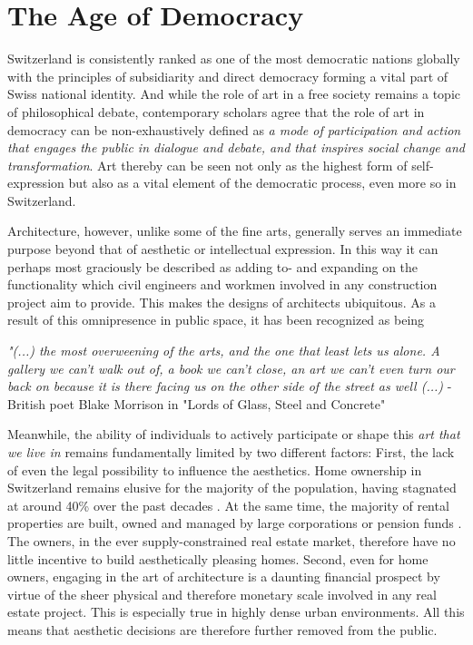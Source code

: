 \documentclass{article}
\begin{document}
\clearpage
\section{The Age of Democracy}
\label{sec:democracy}

\begin{multicols}{2}

Switzerland is consistently ranked as one of the most democratic nations globally \cite{noauthor_economist_2023} with the principles of subsidiarity and direct democracy forming a vital part of Swiss national identity. And while the role of art in a free society remains a topic of philosophical debate, contemporary scholars agree that the role of art in democracy can be non-exhaustively defined as \textit{a mode of participation and action that engages the public in dialogue and debate, and that inspires social change and transformation}. Art thereby can be seen not only as the highest form of self-expression but also as a vital element of the democratic process, even more so in Switzerland.

Architecture, however, unlike some of the fine arts, generally serves an immediate purpose beyond that of aesthetic or intellectual expression. In this way it can perhaps most graciously be described as adding to- and expanding on the functionality which civil engineers and workmen involved in any construction project aim to provide. This makes the designs of architects ubiquitous. As a result of this omnipresence in public space, it has been recognized as being

\textit{"(...) the most overweening of the arts, and the one that least lets us alone. A gallery we can't walk out of, a book we can't close, an art we can't even turn our back on because it is there facing us on the other side of the street as well (...)} - British poet Blake Morrison in "Lords of Glass, Steel and Concrete" \cite{morrison_lords_1982}

Meanwhile, the ability of individuals to actively participate or shape this \textit{art that we live in} \cite{hughes_shock_1980} remains fundamentally limited by two different factors: First, the lack of even the legal possibility to influence the aesthetics. Home ownership in Switzerland remains elusive for the majority of the population, having stagnated at around 40\% over the past decades \cite{noauthor_home_2022}. At the same time, the majority of rental properties are built, owned and managed by large corporations or pension funds \cite{noauthor_wem_nodate}. The owners, in the ever supply-constrained real estate market, therefore have no little incentive to build aesthetically pleasing homes. Second, even for home owners, engaging in the art of architecture is a daunting financial prospect by virtue of the sheer physical and therefore monetary scale involved in any real estate project. This is especially true in highly dense urban environments. All this means that aesthetic decisions are therefore further removed from the public.


\end{multicols}
\end{document}
